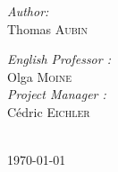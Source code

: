 \begin{titlepage}
\begin{center}
        \begin{minipage}{0.4\textwidth}
            \begin{flushleft} \large
                \emph{Author:}\\
                    Thomas \textsc{Aubin}
            \end{flushleft}
        \end{minipage}
        \begin{minipage}{0.4\textwidth}
            \begin{flushright} \large
                \emph{English Professor :} \\
                Olga \textsc{Moine}\\
                \emph{Project Manager :} \\
                Cédric \textsc{Eichler}\\
            \end{flushright}
        \end{minipage}
        \vfill
        \\[3mm]
        \vfill
        {\large \today}
    \end{center}
\end{titlepage}